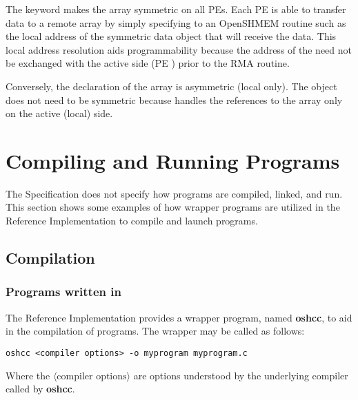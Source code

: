 The  keyword makes the  array symmetric on all \acp{PE}.
Each \ac{PE} is able to transfer data to a remote \dest{} array by simply
specifying to an OpenSHMEM routine such as \hyperref[subsec:shmem_put]{}
the local address of the symmetric data object that will receive the data.
This local address resolution aids programmability because the address of the
\dest{} need not be exchanged with the active side (\ac{PE} ) prior to
the \acf{RMA} routine.

Conversely, the declaration of the  array is asymmetric
(local only).
The \source{} object does not need to be symmetric because \PUT{} handles the
references to the  array only on the active (local) side.



\chapter{Compiling and Running Programs}\label{sec:compiling}
The \openshmem Specification does not specify how
\openshmem programs are compiled, linked, and run. This section shows some
examples of how wrapper programs are utilized in the \openshmem Reference
Implementation to compile and launch programs.

\section{Compilation}
\subsection*{Programs written in \Cstd}

The \openshmem Reference Implementation provides a wrapper program, named
\textbf{oshcc}, to aid in the compilation of \Cstd programs.
The wrapper may be called as follows:

\begin{lstlisting}[]
oshcc <compiler options> -o myprogram myprogram.c
\end{lstlisting}
Where the $\langle\mbox{compiler options}\rangle$ are options understood by the
underlying \Cstd compiler called by \textbf{oshcc}.


